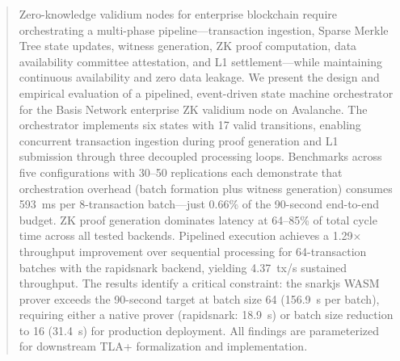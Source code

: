 
\begin{abstract}
Zero-knowledge validium nodes for enterprise blockchain require orchestrating
a multi-phase pipeline---transaction ingestion, Sparse Merkle Tree state
updates, witness generation, ZK proof computation, data availability committee
attestation, and L1 settlement---while maintaining continuous availability and
zero data leakage. We present the design and empirical evaluation of a
pipelined, event-driven state machine orchestrator for the Basis Network
enterprise ZK validium node on Avalanche. The orchestrator implements six
states with 17 valid transitions, enabling concurrent transaction ingestion
during proof generation and L1 submission through three decoupled processing
loops. Benchmarks across five configurations with 30--50 replications each
demonstrate that orchestration overhead (batch formation plus witness
generation) consumes 593~ms per 8-transaction batch---just 0.66\% of the
90-second end-to-end budget. ZK proof generation dominates latency at
64--85\% of total cycle time across all tested backends. Pipelined execution
achieves a 1.29$\times$ throughput improvement over sequential processing for
64-transaction batches with the rapidsnark backend, yielding 4.37~tx/s
sustained throughput. The results identify a critical constraint: the snarkjs
WASM prover exceeds the 90-second target at batch size 64 (156.9~s per batch),
requiring either a native prover (rapidsnark: 18.9~s) or batch size reduction
to 16 (31.4~s) for production deployment. All findings are parameterized for
downstream TLA+ formalization and implementation.
\end{abstract}
